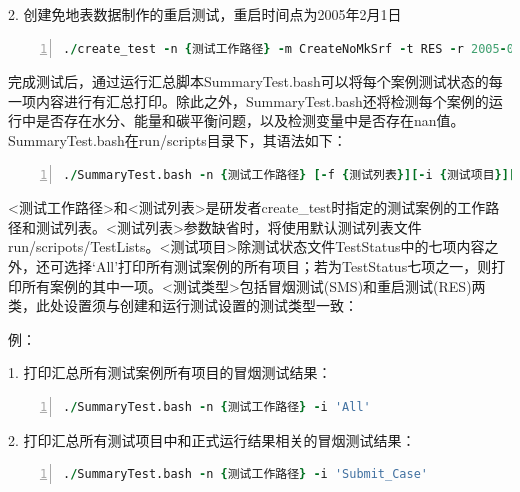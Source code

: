 2. 创建免地表数据制作的重启测试，重启时间点为2005年2月1日
\begin{lstlisting}[language=fortran, basicstyle=\linespread{1.0}\footnotesize\ttfamily, commentstyle=\color{olive}, numbers=left, numberstyle=\tiny, xleftmargin=1.5em,xrightmargin=0em, aboveskip=1em]
   ./create_test -n {测试工作路径} -m CreateNoMkSrf -t RES -r 2005-02-01
\end{lstlisting}


完成测试后，通过运行汇总脚本SummaryTest.bash可以将每个案例测试状态的每一项内容进行有汇总打印。除此之外，SummaryTest.bash还将检测每个案例的运行中是否存在水分、能量和碳平衡问题，以及检测变量中是否存在nan值。SummaryTest.bash在run/scripts目录下，其语法如下：

\begin{lstlisting}[language=fortran, basicstyle=\linespread{1.0}\footnotesize\ttfamily, commentstyle=\color{olive}, numbers=left, numberstyle=\tiny, xleftmargin=1.5em,xrightmargin=0em, aboveskip=1em]
   ./SummaryTest.bash -n {测试工作路径} [-f {测试列表}][-i {测试项目}][-t {测试类型}]
\end{lstlisting}

<测试工作路径>和<测试列表>是研发者create\_test时指定的测试案例的工作路径和测试列表。<测试列表>参数缺省时，将使用默认测试列表文件run/scripots/TestLists。<测试项目>除测试状态文件TestStatus中的七项内容之外，还可选择‘All’打印所有测试案例的所有项目；若为TestStatus七项之一，则打印所有案例的其中一项。<测试类型>包括冒烟测试(SMS)和重启测试(RES)两类，此处设置须与创建和运行测试设置的测试类型一致：

例：

1. 打印汇总所有测试案例所有项目的冒烟测试结果：

\begin{lstlisting}[language=fortran, basicstyle=\linespread{1.0}\footnotesize\ttfamily, commentstyle=\color{olive}, numbers=left, numberstyle=\tiny, xleftmargin=1.5em,xrightmargin=0em, aboveskip=1em]
   ./SummaryTest.bash -n {测试工作路径} -i 'All'
\end{lstlisting}

2. 打印汇总所有测试项目中和正式运行结果相关的冒烟测试结果：

\begin{lstlisting}[language=fortran, basicstyle=\linespread{1.0}\footnotesize\ttfamily, commentstyle=\color{olive}, numbers=left, numberstyle=\tiny, xleftmargin=1.5em,xrightmargin=0em, aboveskip=1em]
   ./SummaryTest.bash -n {测试工作路径} -i 'Submit_Case'
\end{lstlisting}

